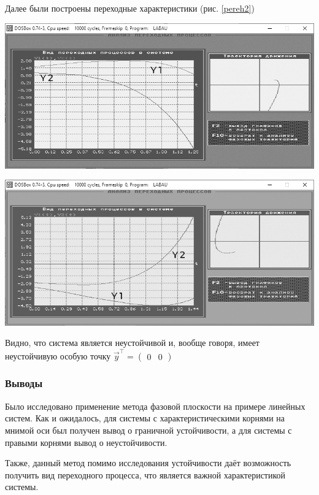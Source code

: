 	Далее были построены переходные характеристики (рис. \ref{pereh2})
	\vspace{0.5em}
	
	\noindent\begin{minipage}[h]{.5\textwidth}
		\centering\includegraphics[width=.98\textwidth,trim={0 0 0 20px},clip]{Узел/переходной1.png}
	\end{minipage}
	\begin{minipage}[h]{.5\textwidth}
		\centering\includegraphics[width=.98\textwidth,trim={0 0 0 20px},clip]{Узел/переходной2.png}
	\end{minipage}
	{
		\label{pereh2}}
	
	\vspace{0.5em}
	Видно, что система является неустойчивой и, вообще говоря, имеет неустойчивую особую точку $\vec{y}^\intercal = \begin{pmatrix}0 & 0\end{pmatrix}$
	
	\subsubsection{Выводы}
	
	Было исследовано применение метода фазовой плоскости на примере линейных систем. Как и ожидалось, для системы с характеристическими корнями на мнимой оси был получен вывод о граничной устойчивости, а для системы с правыми корнями вывод о неустойчивости.
	
	Также, данный метод помимо исследования устойчивости даёт возможность получить вид переходного процесса, что является важной характеристикой системы. 
	

